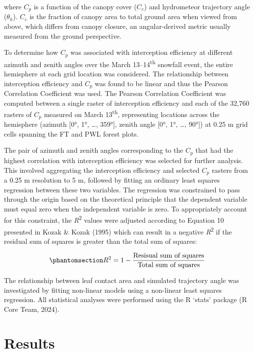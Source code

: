 \documentclass[
  letterpaper,
]{tex/uofsthesis-cs}
\begin{document}
where \(C_p\) is a function of the canopy cover (\(C_c\)) and
hydrometeor trajectory angle (\(\theta_h\)). \(C_c\) is the fraction of
canopy area to total ground area when viewed from above, which differs
from canopy closure, an angular-derived metric usually measured from the
ground perspective.

To determine how \(C_p\) was associated with interception efficiency at
different azimuth and zenith angles over the March
13--14\textsuperscript{th} snowfall event, the entire hemisphere at each
grid location was considered. The relationship between interception
efficiency and \(C_p\) was found to be linear and thus the Pearson
Correlation Coefficient was used. The Pearson Correlation Coefficient
was computed between a single raster of interception efficiency and each
of the 32,760 rasters of \(C_p\) measured on March
13\textsuperscript{th}, representing locations across the hemisphere
(azimuth {[}0°, 1°, \ldots, 359°{]}, zenith angle {[}0°, 1°, \ldots,
90°{]}) at 0.25 m grid cells spanning the FT and PWL forest plots.

The pair of azimuth and zenith angles corresponding to the \(C_p\) that
had the highest correlation with interception efficiency was selected
for further analysis. This involved aggregating the interception
efficiency and selected \(C_p\) rasters from a 0.25 m resolution to 5 m,
followed by fitting an ordinary least squares regression between these
two variables. The regression was constrained to pass through the origin
based on the theoretical principle that the dependent variable must
equal zero when the independent variable is zero. To appropriately
account for this constraint, the \emph{R}\textsuperscript{2} values were
adjusted according to Equation 10 presented in Kozak \& Kozak (1995)
which can result in a negative \emph{R}\textsuperscript{2} if the
residual sum of squares is greater than the total sum of squares:

\begin{equation}\phantomsection\label{eq-kozak}{
R^2 = 1 - \frac{\text{Resisual sum of squares}}{\text{Total sum of squares}}
}\end{equation}

The relationship between leaf contact area and simulated trajectory
angle was investigated by fitting non-linear models using a non-linear
least squares regression. All statistical analyses were performed using
the R `stats' package (R Core Team, 2024).

\section{Results}\label{results}
\end{document}

